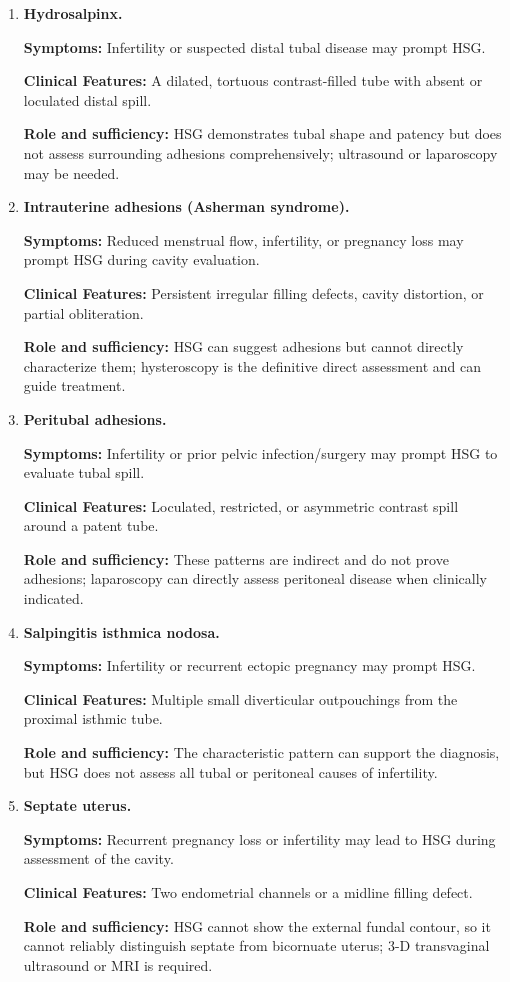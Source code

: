 \begin{enumerate}[leftmargin=*,itemsep=0.45em,topsep=0.4em]
\item \textbf{Hydrosalpinx.}\par\noindent\textbf{Symptoms:} Infertility or suspected distal tubal disease may prompt HSG.\par\noindent\textbf{Clinical Features:} A dilated, tortuous contrast-filled tube with absent or loculated distal spill.\par\noindent\textbf{Role and sufficiency:} HSG demonstrates tubal shape and patency but does not assess surrounding adhesions comprehensively; ultrasound or laparoscopy may be needed.
\item \textbf{Intrauterine adhesions (Asherman syndrome).}\par\noindent\textbf{Symptoms:} Reduced menstrual flow, infertility, or pregnancy loss may prompt HSG during cavity evaluation.\par\noindent\textbf{Clinical Features:} Persistent irregular filling defects, cavity distortion, or partial obliteration.\par\noindent\textbf{Role and sufficiency:} HSG can suggest adhesions but cannot directly characterize them; hysteroscopy is the definitive direct assessment and can guide treatment.
\item \textbf{Peritubal adhesions.}\par\noindent\textbf{Symptoms:} Infertility or prior pelvic infection/surgery may prompt HSG to evaluate tubal spill.\par\noindent\textbf{Clinical Features:} Loculated, restricted, or asymmetric contrast spill around a patent tube.\par\noindent\textbf{Role and sufficiency:} These patterns are indirect and do not prove adhesions; laparoscopy can directly assess peritoneal disease when clinically indicated.
\item \textbf{Salpingitis isthmica nodosa.}\par\noindent\textbf{Symptoms:} Infertility or recurrent ectopic pregnancy may prompt HSG.\par\noindent\textbf{Clinical Features:} Multiple small diverticular outpouchings from the proximal isthmic tube.\par\noindent\textbf{Role and sufficiency:} The characteristic pattern can support the diagnosis, but HSG does not assess all tubal or peritoneal causes of infertility.
\item \textbf{Septate uterus.}\par\noindent\textbf{Symptoms:} Recurrent pregnancy loss or infertility may lead to HSG during assessment of the cavity.\par\noindent\textbf{Clinical Features:} Two endometrial channels or a midline filling defect.\par\noindent\textbf{Role and sufficiency:} HSG cannot show the external fundal contour, so it cannot reliably distinguish septate from bicornuate uterus; 3-D transvaginal ultrasound or MRI is required.

\end{enumerate}
